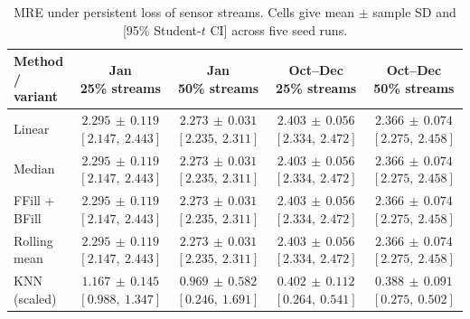 \clearpage

\begin{table}[htbp]
\centering
\caption{{MRE under persistent loss of sensor streams. Cells give mean $\pm$ sample SD and [95\% Student-$t$ CI] across five seed runs.}}
\label{tab:p03_A3}
\begingroup
\footnotesize
\setlength{\tabcolsep}{3pt}
\renewcommand{\arraystretch}{1.15}
\begin{tabular}{lcccc}
\toprule
Method / variant & \makecell{Jan\\25\% streams} & \makecell{Jan\\50\% streams} & \makecell{Oct--Dec\\25\% streams} & \makecell{Oct--Dec\\50\% streams} \\
\midrule
Linear & \makecell[c]{$2.295\,\pm\,0.119$\\$[2.147,\ 2.443]$} & \makecell[c]{$2.273\,\pm\,0.031$\\$[2.235,\ 2.311]$} & \makecell[c]{$2.403\,\pm\,0.056$\\$[2.334,\ 2.472]$} & \makecell[c]{$2.366\,\pm\,0.074$\\$[2.275,\ 2.458]$} \\
Median & \makecell[c]{$2.295\,\pm\,0.119$\\$[2.147,\ 2.443]$} & \makecell[c]{$2.273\,\pm\,0.031$\\$[2.235,\ 2.311]$} & \makecell[c]{$2.403\,\pm\,0.056$\\$[2.334,\ 2.472]$} & \makecell[c]{$2.366\,\pm\,0.074$\\$[2.275,\ 2.458]$} \\
FFill + BFill & \makecell[c]{$2.295\,\pm\,0.119$\\$[2.147,\ 2.443]$} & \makecell[c]{$2.273\,\pm\,0.031$\\$[2.235,\ 2.311]$} & \makecell[c]{$2.403\,\pm\,0.056$\\$[2.334,\ 2.472]$} & \makecell[c]{$2.366\,\pm\,0.074$\\$[2.275,\ 2.458]$} \\
Rolling mean & \makecell[c]{$2.295\,\pm\,0.119$\\$[2.147,\ 2.443]$} & \makecell[c]{$2.273\,\pm\,0.031$\\$[2.235,\ 2.311]$} & \makecell[c]{$2.403\,\pm\,0.056$\\$[2.334,\ 2.472]$} & \makecell[c]{$2.366\,\pm\,0.074$\\$[2.275,\ 2.458]$} \\
KNN (scaled) & \makecell[c]{$1.167\,\pm\,0.145$\\$[0.988,\ 1.347]$} & \makecell[c]{$0.969\,\pm\,0.582$\\$[0.246,\ 1.691]$} & \makecell[c]{$0.402\,\pm\,0.112$\\$[0.264,\ 0.541]$} & \makecell[c]{$0.388\,\pm\,0.091$\\$[0.275,\ 0.502]$} \\

\end{tabular}
\end{table}
